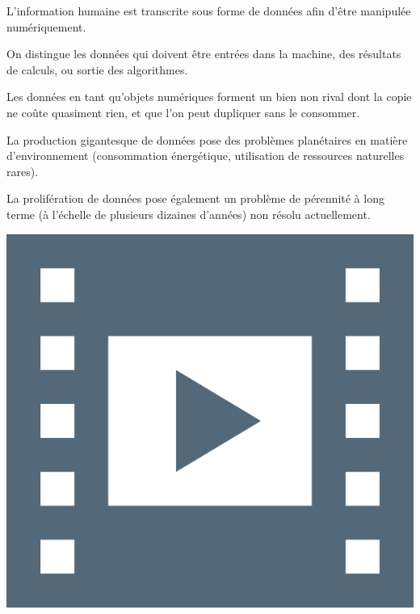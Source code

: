 \begin{jazzitemize}
\item L'information humaine est transcrite sous forme de données afin d'ê\-tre manipulée numériquement.
\item On distingue les données qui doivent être entrées dans la machine, des résultats de calculs, ou sortie des algorithmes. 
\item Les données en tant qu'objets numériques forment un bien non rival  dont la copie ne coûte quasiment rien, et que l'on peut dupliquer sans le consommer.
\item La production gigantesque de données pose des problèmes planétaires en matière d'environnement (consommation énergéti\-que, utilisation de ressources naturelles rares).
\item La prolifération de données pose également un problème de pérennité à long terme (à l'échelle de plusieurs dizaines d'années) non résolu actuellement.
\end{jazzitemize}
\parnotes



\begin{marginvideo}
	[\label{vid:VIII.1}Données et traitements.]%
	\href{https://www.youtube.com/watch?v=IJJgcZ2DEs0}%
	  {\includegraphics[width=\marginparwidth]{./Images/Pictograms/film-strip-dark-electric-blue.png}}%
\end{marginvideo}

